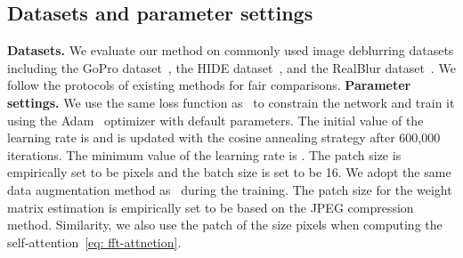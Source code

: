 \documentclass[10pt,twocolumn,letterpaper]{article}
\begin{document}
\subsection{Datasets and parameter settings}
{\flushleft \textbf{Datasets.}}
We evaluate our method on commonly used image deblurring datasets including the GoPro dataset~\cite{GoPro}, the HIDE dataset~\cite{HIDE}, and the RealBlur dataset~\cite{Realblur}.
We follow the protocols of existing methods for fair comparisons.
{\flushleft \textbf{Parameter settings.}}
We use the same loss function as~\cite{MIMO} to constrain the network and train it using the Adam~\cite{Adam} optimizer with default parameters.
The initial value of the learning rate is  and is updated with the cosine annealing strategy after 600,000 iterations. The minimum value of the learning rate is .
The patch size is empirically set to be  pixels and the batch size is set to be 16.
We adopt the same data augmentation method as~\cite{Restormer} during the training.
The patch size for the weight matrix estimation is empirically set to be  based on the JPEG compression method.
Similarity, we also use the patch of the size  pixels when computing the self-attention~\eqref{eq: fft-attnetion}.
\end{document}
